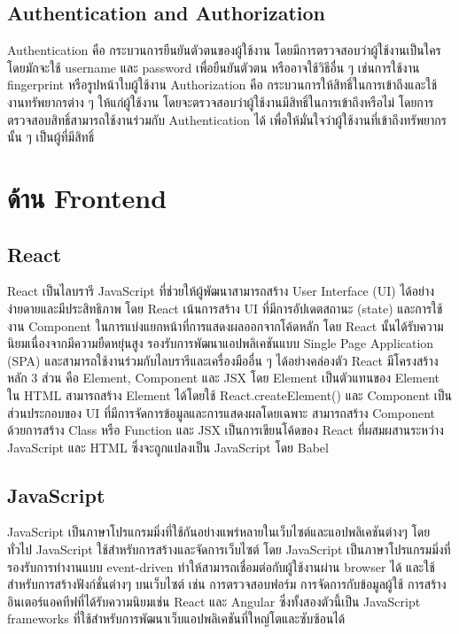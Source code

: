 \subsection{Authentication and Authorization}
Authentication คือ กระบวนการยืนยันตัวตนของผู้ใช้งาน โดยมีการตรวจสอบว่าผู้ใช้งานเป็นใคร โดยมักจะใช้ username และ password เพื่อยืนยันตัวตน หรืออาจใช้วิธีอื่น ๆ เช่นการใช้งาน fingerprint หรือรูปหน้าใบผู้ใช้งาน
\enskip
Authorization คือ กระบวนการให้สิทธิ์ในการเข้าถึงและใช้งานทรัพยากรต่าง ๆ ให้แก่ผู้ใช้งาน โดยจะตรวจสอบว่าผู้ใช้งานมีสิทธิ์ในการเข้าถึงหรือไม่ โดยการตรวจสอบสิทธิ์สามารถใช้งานร่วมกับ Authentication ได้ เพื่อให้มั่นใจว่าผู้ใช้งานที่เข้าถึงทรัพยากรนั้น ๆ เป็นผู้ที่มีสิทธิ์\cite{Auth}

\section{ด้าน Frontend}

\subsection{React}
    React เป็นไลบรารี JavaScript ที่ช่วยให้ผู้พัฒนาสามารถสร้าง User Interface (UI) ได้อย่างง่ายดายและมีประสิทธิภาพ โดย React เน้นการสร้าง UI ที่มีการอัปเดตสถานะ (state) 
และการใช้งาน Component ในการแบ่งแยกหน้าที่การแสดงผลออกจากโค้ดหลัก โดย React นั้นได้รับความนิยมเนื่องจากมีความยืดหยุ่นสูง รองรับการพัฒนาแอปพลิเคชันแบบ Single Page Application (SPA) 
และสามารถใช้งานร่วมกับไลบรารีและเครื่องมืออื่น ๆ ได้อย่างคล่องตัว
    React มีโครงสร้างหลัก 3 ส่วน คือ Element, Component และ JSX โดย Element เป็นตัวแทนของ Element ใน HTML สามารถสร้าง Element ได้โดยใช้ React.createElement() 
และ Component เป็นส่วนประกอบของ UI ที่มีการจัดการข้อมูลและการแสดงผลโดยเฉพาะ สามารถสร้าง Component ด้วยการสร้าง Class หรือ Function และ JSX เป็นการเขียนโค้ดของ React 
ที่ผสมผสานระหว่าง JavaScript และ HTML ซึ่งจะถูกแปลงเป็น JavaScript โดย Babel\cite{React}

\subsection{JavaScript}
JavaScript เป็นภาษาโปรแกรมมิ่งที่ใช้กันอย่างแพร่หลายในเว็บไซต์และแอปพลิเคชันต่างๆ โดยทั่วไป JavaScript ใช้สำหรับการสร้างและจัดการเว็บไซต์ โดย JavaScript 
เป็นภาษาโปรแกรมมิ่งที่รองรับการทำงานแบบ event-driven ทำให้สามารถเชื่อมต่อกับผู้ใช้งานผ่าน browser ได้ และใช้สำหรับการสร้างฟังก์ชั่นต่างๆ บนเว็บไซต์ เช่น การตรวจสอบฟอร์ม 
การจัดการกับข้อมูลผู้ใช้ การสร้างอินเตอร์แอคทีฟที่ได้รับความนิยมเช่น React และ Angular ซึ่งทั้งสองตัวนี้เป็น JavaScript frameworks ที่ใช้สำหรับการพัฒนาเว็บแอปพลิเคชันที่ใหญ่โตและซับซ้อนได้\cite{JavaScript}


